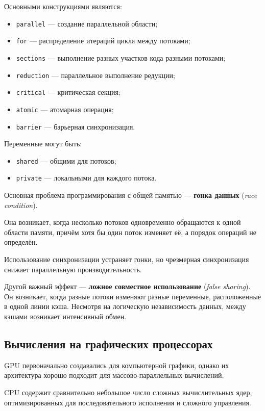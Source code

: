 Основными конструкциями являются:
\begin{itemize}
	\item \texttt{parallel} --- создание параллельной области;
	\item \texttt{for} --- распределение итераций цикла между потоками;
	\item \texttt{sections} --- выполнение разных участков кода разными потоками;
	\item \texttt{reduction} --- параллельное выполнение редукции;
	\item \texttt{critical} --- критическая секция;
	\item \texttt{atomic} --- атомарная операция;
	\item \texttt{barrier} --- барьерная синхронизация.
\end{itemize}

Переменные могут быть:
\begin{itemize}
	\item \texttt{shared} --- общими для потоков;
	\item \texttt{private} --- локальными для каждого потока.
\end{itemize}

Основная проблема программирования с общей памятью ---
\textbf{гонка данных} (\textit{race condition}).

Она возникает, когда несколько потоков одновременно обращаются к одной области
памяти, причём хотя бы один поток изменяет её, а порядок операций не определён.

Использование синхронизации устраняет гонки, но чрезмерная синхронизация
снижает параллельную производительность.

Другой важный эффект --- \textbf{ложное совместное использование}
(\textit{false sharing}). Он возникает, когда разные потоки изменяют разные
переменные, расположенные в одной линии кэша. Несмотря на логическую независимость
данных, между кэшами возникает интенсивный обмен.

\subsection{Вычисления на графических процессорах}

GPU первоначально создавались для компьютерной графики, однако их архитектура
хорошо подходит для массово-параллельных вычислений.

CPU содержит сравнительно небольшое число сложных вычислительных ядер,
оптимизированных для последовательного исполнения и сложного управления.

